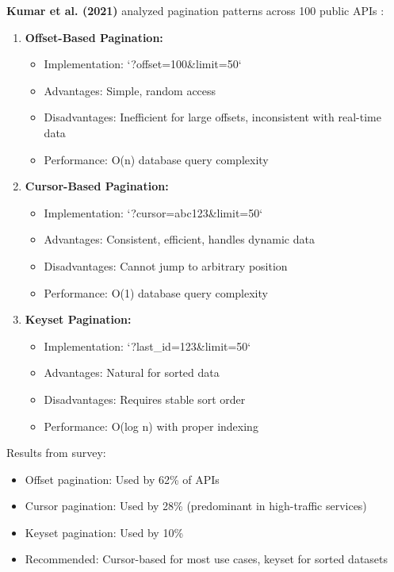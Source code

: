 \documentclass[conference]{IEEEtran}
\begin{document}
\textbf{Kumar et al. (2021)} analyzed pagination patterns across 100 public APIs \cite{kumar2021pagination}:

\begin{enumerate}
    \item \textbf{Offset-Based Pagination:}
    \begin{itemize}
        \item Implementation: `?offset=100&limit=50`
        \item Advantages: Simple, random access
        \item Disadvantages: Inefficient for large offsets, inconsistent with real-time data
        \item Performance: O(n) database query complexity
    \end{itemize}
    
    \item \textbf{Cursor-Based Pagination:}
    \begin{itemize}
        \item Implementation: `?cursor=abc123&limit=50`
        \item Advantages: Consistent, efficient, handles dynamic data
        \item Disadvantages: Cannot jump to arbitrary position
        \item Performance: O(1) database query complexity
    \end{itemize}
    
    \item \textbf{Keyset Pagination:}
    \begin{itemize}
        \item Implementation: `?last_id=123&limit=50`
        \item Advantages: Natural for sorted data
        \item Disadvantages: Requires stable sort order
        \item Performance: O(log n) with proper indexing
    \end{itemize}
\end{enumerate}

Results from survey:
\begin{itemize}
    \item Offset pagination: Used by 62\% of APIs
    \item Cursor pagination: Used by 28\% (predominant in high-traffic services)
    \item Keyset pagination: Used by 10\%
    \item Recommended: Cursor-based for most use cases, keyset for sorted datasets
\end{itemize}
\end{document}
